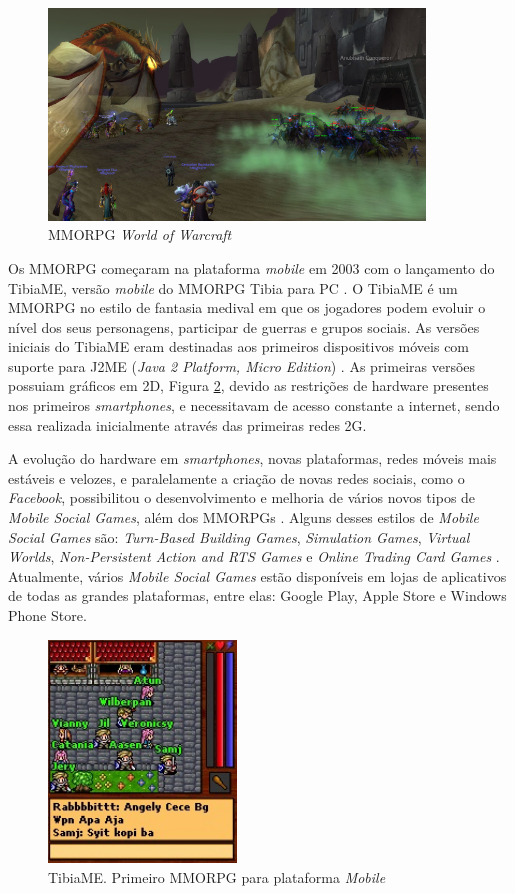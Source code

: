 \begin{figure}[h]
  \centering
  \includegraphics[width=10cm]{figuras/wow.jpg}
  \caption{MMORPG \textit{World of Warcraft} \cite{kotaku}}
  \label{figura:wow}
\end{figure}

Os MMORPG começaram na plataforma \textit{mobile} em 2003 com o lançamento do TibiaME, versão \textit{mobile} do MMORPG Tibia para PC \cite{tibiaME}. O TibiaME é um MMORPG no estilo de fantasia medival em que os jogadores podem evoluir o nível dos seus personagens, participar de guerras e grupos sociais. As versões iniciais do TibiaME eram destinadas aos primeiros dispositivos móveis com suporte para J2ME (\textit{Java 2 Platform, Micro Edition}) \cite{tibiaMEhistory}. As primeiras versões possuiam gráficos em 2D, Figura \ref{figura:tibiaME}, devido as restrições de hardware presentes nos primeiros \textit{smartphones}, e necessitavam de acesso constante a internet, sendo essa realizada inicialmente através das primeiras redes 2G.

A evolução do hardware em \textit{smartphones}, novas plataformas, redes móveis mais estáveis e velozes, e paralelamente a criação de novas redes sociais, como o \textit{Facebook}, possibilitou o desenvolvimento e melhoria de vários novos tipos de \textit{Mobile Social Games}, além dos MMORPGs \cite{fields2014}. Alguns desses estilos de \textit{Mobile Social Games} são: \textit{Turn-Based Building Games}, \textit{Simulation Games}, \textit{Virtual Worlds}, \textit{Non-Persistent Action and RTS Games} e \textit{Online Trading Card Games} \cite{fields2014}. Atualmente, vários \textit{Mobile Social Games} estão disponíveis em lojas de aplicativos de todas as grandes plataformas, entre elas: Google Play, Apple Store e Windows Phone Store.

\begin{figure}[h]
  \centering
  \includegraphics[width=5cm]{figuras/tibiaME}
  \caption{TibiaME. Primeiro MMORPG para plataforma \textit{Mobile} \cite{tibiaMEhistory}}
  \label{figura:tibiaME}
\end{figure}

